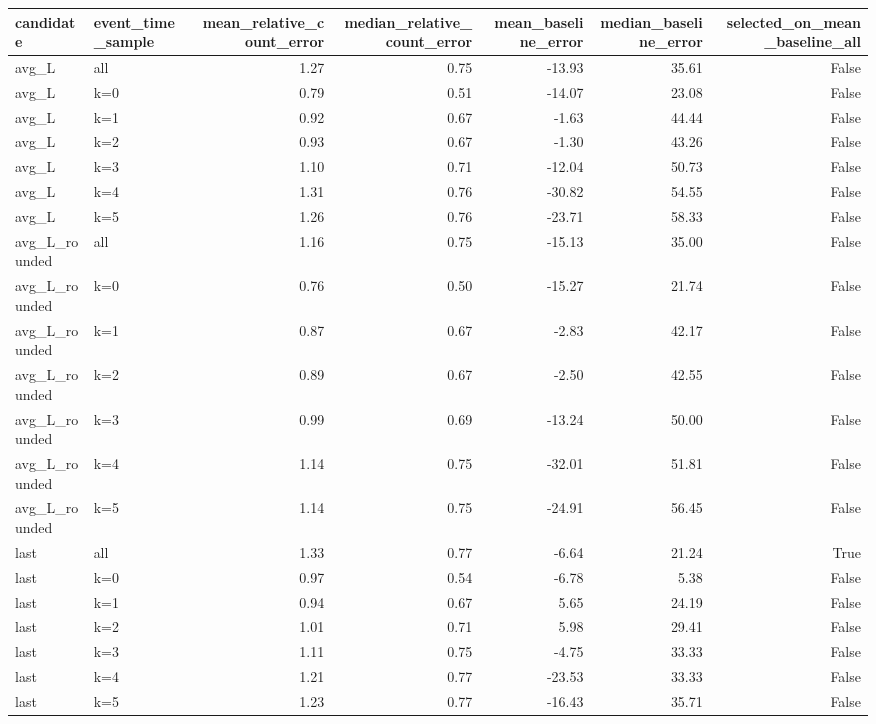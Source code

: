 \begin{tabular}{llrrrrr}
\toprule
candidate & event_time_sample & mean_relative_count_error & median_relative_count_error & mean_baseline_error & median_baseline_error & selected_on_mean_baseline_all \\
\midrule
avg_L & all & 1.27 & 0.75 & -13.93 & 35.61 & False \\
avg_L & k=0 & 0.79 & 0.51 & -14.07 & 23.08 & False \\
avg_L & k=1 & 0.92 & 0.67 & -1.63 & 44.44 & False \\
avg_L & k=2 & 0.93 & 0.67 & -1.30 & 43.26 & False \\
avg_L & k=3 & 1.10 & 0.71 & -12.04 & 50.73 & False \\
avg_L & k=4 & 1.31 & 0.76 & -30.82 & 54.55 & False \\
avg_L & k=5 & 1.26 & 0.76 & -23.71 & 58.33 & False \\
avg_L_rounded & all & 1.16 & 0.75 & -15.13 & 35.00 & False \\
avg_L_rounded & k=0 & 0.76 & 0.50 & -15.27 & 21.74 & False \\
avg_L_rounded & k=1 & 0.87 & 0.67 & -2.83 & 42.17 & False \\
avg_L_rounded & k=2 & 0.89 & 0.67 & -2.50 & 42.55 & False \\
avg_L_rounded & k=3 & 0.99 & 0.69 & -13.24 & 50.00 & False \\
avg_L_rounded & k=4 & 1.14 & 0.75 & -32.01 & 51.81 & False \\
avg_L_rounded & k=5 & 1.14 & 0.75 & -24.91 & 56.45 & False \\
last & all & 1.33 & 0.77 & -6.64 & 21.24 & True \\
last & k=0 & 0.97 & 0.54 & -6.78 & 5.38 & False \\
last & k=1 & 0.94 & 0.67 & 5.65 & 24.19 & False \\
last & k=2 & 1.01 & 0.71 & 5.98 & 29.41 & False \\
last & k=3 & 1.11 & 0.75 & -4.75 & 33.33 & False \\
last & k=4 & 1.21 & 0.77 & -23.53 & 33.33 & False \\
last & k=5 & 1.23 & 0.77 & -16.43 & 35.71 & False \\
\bottomrule
\end{tabular}

